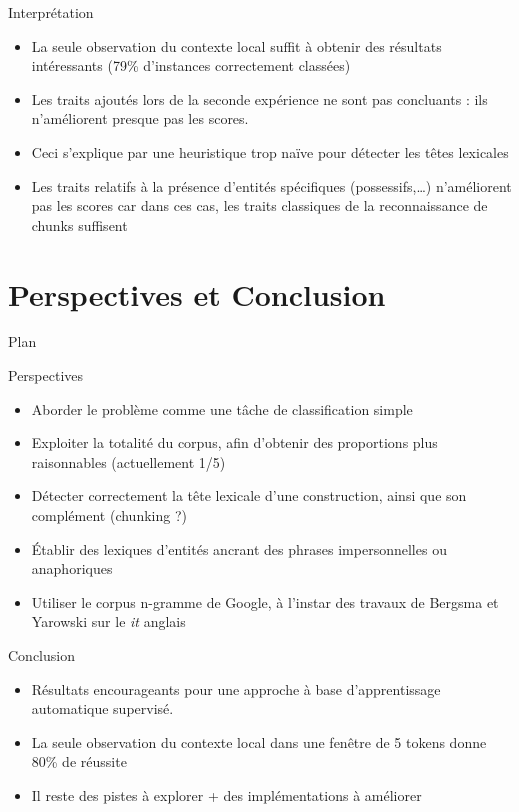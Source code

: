 \documentclass{beamer}
\begin{document}
\begin{frame}{Interprétation}
\begin{itemize}
  \item La seule observation du contexte local suffit à obtenir des résultats intéressants (79\% d'instances correctement classées)
  \item Les traits ajoutés lors de la seconde expérience ne sont pas concluants : ils n'améliorent presque pas les scores.
  \item Ceci s'explique par une heuristique trop na\"ive pour détecter les têtes lexicales
  \item Les traits relatifs à la présence d'entités spécifiques (possessifs,\ldots) n'améliorent pas les scores car dans ces cas, les traits classiques de la reconnaissance de chunks suffisent
\end{itemize}
\end{frame}


\section{Perspectives et Conclusion}

\begin{frame}{Plan}
  \tableofcontents[currentsection]
\end{frame}

\begin{frame}{Perspectives}
\begin{itemize}
  \item Aborder le problème comme une t\^ache de classification simple
  \item Exploiter la totalité du corpus, afin d'obtenir des proportions plus raisonnables (actuellement 1/5)
  \item Détecter correctement la t\^ete lexicale d'une construction, ainsi que son complément (chunking ?)
  \item Établir des lexiques d'entités ancrant des phrases impersonnelles ou anaphoriques
  \item Utiliser le corpus n-gramme de Google, à l'instar des travaux de Bergsma et Yarowski sur le \og \textit{it} \fg{} anglais 
\end{itemize}
\end{frame}

\begin{frame}{Conclusion}
\begin{itemize}
  \item Résultats encourageants pour une approche à base d'apprentissage automatique supervisé.
  \item La seule observation du contexte local dans une fenêtre de 5 tokens donne 80\% de réussite
  \item Il reste des pistes à explorer + des implémentations à améliorer
\end{itemize}
\end{frame}
\end{document}
